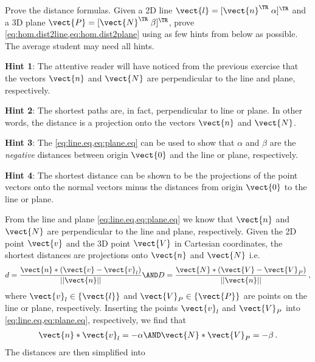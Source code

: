 \documentclass[oneandhalfcolumn]{coursenotes-handout}
\begin{document}
\begin{exercise}\label{exc:homog.dist.formulas}
  Prove the distance formulas. Given a 2D line \(\vect{l} = [\vect{n}^{\TR} \; \alpha]^{\TR}\) and a 3D plane \(\vect{P} = [\vect{N}^{\TR} \; \beta]^{\TR}\), prove \cref{eq:hom.dist2line,eq:hom.dist2plane} using as few hints from below as possible. The average student may need all hints.

  \begin{scorecard}
    \item \textbf{Hint 1}: The attentive reader will have noticed from the previous exercise that the vectors \(\vect{n}\) and \(\vect{N}\) are perpendicular to the line and plane, respectively.
    \item \textbf{Hint 2}: The shortest paths are, in fact, perpendicular to line or plane. In other words, the distance is a projection onto the vectors \(\vect{n}\) and \(\vect{N}\).
    \item \textbf{Hint 3}: The \cref{eq:line.eq,eq:plane.eq} can be used to show that \(\alpha\) and \(\beta\) are the \emph{negative} distances between origin \(\vect{0}\) and the line or plane, respectively.
    \item \textbf{Hint 4}: The shortest distance can be shown to be the projections of the point vectors onto the normal vectors minus the distances from origin \(\vect{0}\) to the line or plane.
  \end{scorecard}
\solution
  From the line and plane \cref{eq:line.eq,eq:plane.eq} we know that \(\vect{n}\) and \(\vect{N}\) are perpendicular to the line and plane, respectively. Given the 2D point \(\vect{v}\) and the 3D point \(\vect{V}\) in Cartesian coordinates, the shortest distances are projections onto \(\vect{n}\) and \(\vect{N}\) i.e.
  \begin{align}
    d = \frac{\vect{n} * (\vect{v} - \vect{v}_l)}{||\vect{n}||} \AND
    D = \frac{\vect{N} * (\vect{V} - \vect{V}_P)}{||\vect{n}||} \,,
  \end{align}
  where \(\vect{v}_l \in \{\vect{l}\}\) and \(\vect{V}_P \in \{\vect{P}\}\) are points on the line or plane, respectively. Inserting the points \(\vect{v}_l\) and \(\vect{V}_P\) into \cref{eq:line.eq,eq:plane.eq}, respectively, we find that
  \begin{align}
    \vect{n} * \vect{v}_l = - \alpha \AND
    \vect{N} * \vect{V}_P = - \beta \,.
  \end{align}
  The distances are then simplified into
  \begin{align}

\end{align}
\end{exercise}
\end{document}
